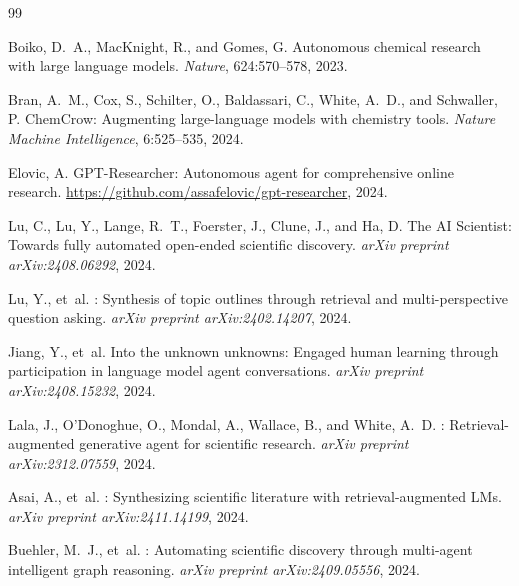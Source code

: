\documentclass[11pt,a4paper]{article}
\begin{document}


\begin{thebibliography}{99}

Boiko, D.~A., MacKnight, R., and Gomes, G.
\newblock Autonomous chemical research with large language models.
\newblock \emph{Nature}, 624:570--578, 2023.

Bran, A.~M., Cox, S., Schilter, O., Baldassari, C., White, A.~D., and
Schwaller, P.
\newblock ChemCrow: Augmenting large-language models with chemistry tools.
\newblock \emph{Nature Machine Intelligence}, 6:525--535, 2024.

Elovic, A.
\newblock GPT-Researcher: Autonomous agent for comprehensive online research.
\newblock \url{https://github.com/assafelovic/gpt-researcher}, 2024.

Lu, C., Lu, Y., Lange, R.~T., Foerster, J., Clune, J., and Ha, D.
\newblock The {AI Scientist}: Towards fully automated open-ended scientific
  discovery.
\newblock \emph{arXiv preprint arXiv:2408.06292}, 2024.

Lu, Y., et~al.
: Synthesis of topic outlines through retrieval and
  multi-perspective question asking.
\newblock \emph{arXiv preprint arXiv:2402.14207}, 2024.

Jiang, Y., et~al.
\newblock Into the unknown unknowns: Engaged human learning through
  participation in language model agent conversations.
\newblock \emph{arXiv preprint arXiv:2408.15232}, 2024.

Lala, J., O'Donoghue, O., Mondal, A., Wallace, B., and White, A.~D.
: Retrieval-augmented generative agent for scientific
  research.
\newblock \emph{arXiv preprint arXiv:2312.07559}, 2024.

Asai, A., et~al.
: Synthesizing scientific literature with
  retrieval-augmented {LM}s.
\newblock \emph{arXiv preprint arXiv:2411.14199}, 2024.

Buehler, M.~J., et~al.
: Automating scientific discovery through multi-agent
  intelligent graph reasoning.
\newblock \emph{arXiv preprint arXiv:2409.05556}, 2024.


\end{thebibliography}
\end{document}
